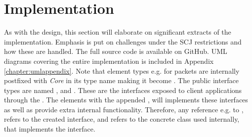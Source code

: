 \section{Implementation}
As with the design, this section will elaborate on significant extracts of the implementation. Emphasis is put on challenges under the SCJ restrictions and how these are handled. The full source code is available on GitHub\cite{SW902e12:CSPinSCJ}. UML diagrams covering the entire implementation is included in Appendix \ref{chapter:umlappendix}. Note that element types e.g. for packets are internally postfixed with \textit{Core} in its type name making it become . The public interface types are named ,  and . These are the interfaces exposed to client applications through the . The elements with the appended , will implements these interfaces as well as provide extra internal functionality. Therefore, any reference e.g. to , refers to the created interface, and  refers to the concrete class used internally, that implements the interface.